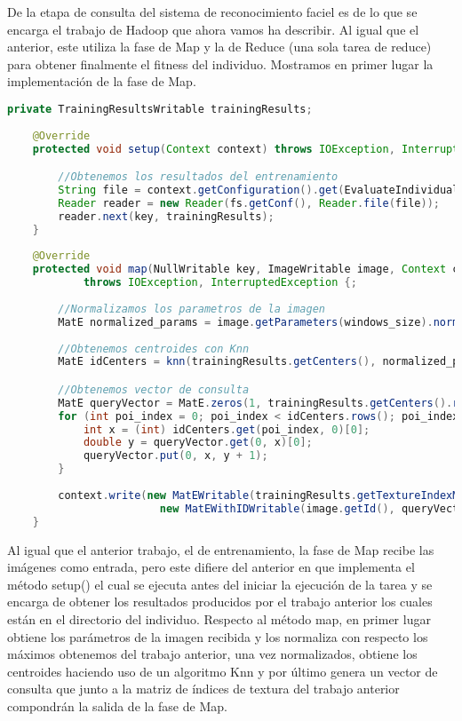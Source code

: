 De la etapa de consulta del sistema de reconocimiento faciel es de lo que se encarga el trabajo de Hadoop que ahora vamos ha describir. Al igual que el anterior, este utiliza la fase de Map y la de Reduce (una sola tarea de reduce) para obtener finalmente el fitness del individuo. Mostramos en primer lugar la implementación de la fase de Map.

 \begin{lstlisting}[language=Java]
 	private TrainingResultsWritable trainingResults;
 
	@Override
	protected void setup(Context context) throws IOException, InterruptedException {

		//Obtenemos los resultados del entrenamiento
		String file = context.getConfiguration().get(EvaluateIndividual.INDIVIDUAL_DIR_PARAM).concat("training/part-r-00000");
		Reader reader = new Reader(fs.getConf(), Reader.file(file));
		reader.next(key, trainingResults);
	}
	
	@Override
	protected void map(NullWritable key, ImageWritable image, Context context)
			throws IOException, InterruptedException {;
		
		//Normalizamos los parametros de la imagen
		MatE normalized_params = image.getParameters(windows_size).normalize(trainingResults.getMaxPerCol());
		
		//Obtenemos centroides con Knn
		MatE idCenters = knn(trainingResults.getCenters(), normalized_params);

		//Obtenemos vector de consulta		
		MatE queryVector = MatE.zeros(1, trainingResults.getCenters().rows(), CvType.CV_64F);
		for (int poi_index = 0; poi_index < idCenters.rows(); poi_index++) {
			int x = (int) idCenters.get(poi_index, 0)[0];
			double y = queryVector.get(0, x)[0];
			queryVector.put(0, x, y + 1);
		}
		
		context.write(new MatEWritable(trainingResults.getTextureIndexMatrix()), 
						new MatEWithIDWritable(image.getId(), queryVector));
	}
\end{lstlisting}

Al igual que el anterior trabajo, el de entrenamiento, la fase de Map recibe las imágenes como entrada, pero este difiere del anterior en que implementa el método setup() el cual se ejecuta antes del iniciar la ejecución de la tarea y se encarga de obtener los resultados producidos por el trabajo anterior los cuales están en el directorio del individuo. Respecto al método map, en primer lugar obtiene los parámetros de la imagen recibida y los normaliza con respecto los máximos obtenemos del trabajo anterior, una vez normalizados, obtiene los centroides haciendo uso de un algoritmo Knn y por \'ultimo genera un vector de consulta que junto a la matriz de \'indices de textura del trabajo anterior compondrán la salida de la fase de Map.

